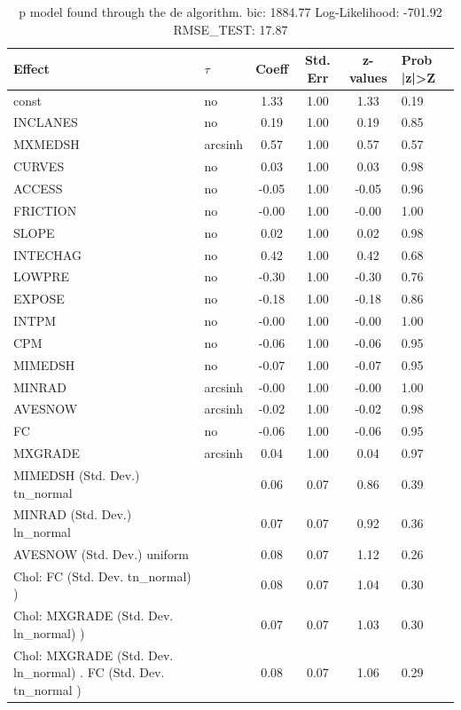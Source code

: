 \begin{table}
	\caption{p model found through the de algorithm. bic: 1884.77 Log-Likelihood: -701.92 RMSE_TEST: 17.87}
	\begin{center}
		\begin{tabular}{|l|l|c|c|c|l|}
			\hline
			Effect & $\tau$ & Coeff & Std. Err & z-values & Prob |z|>Z \\
			\hline
			const & no & 1.33 & 1.00 & 1.33 & 0.19 \\
			\hline
			INCLANES & no & 0.19 & 1.00 & 0.19 & 0.85 \\
			\hline
			MXMEDSH & arcsinh & 0.57 & 1.00 & 0.57 & 0.57 \\
			\hline
			CURVES & no & 0.03 & 1.00 & 0.03 & 0.98 \\
			\hline
			ACCESS & no & -0.05 & 1.00 & -0.05 & 0.96 \\
			\hline
			FRICTION & no & -0.00 & 1.00 & -0.00 & 1.00 \\
			\hline
			SLOPE & no & 0.02 & 1.00 & 0.02 & 0.98 \\
			\hline
			INTECHAG & no & 0.42 & 1.00 & 0.42 & 0.68 \\
			\hline
			LOWPRE & no & -0.30 & 1.00 & -0.30 & 0.76 \\
			\hline
			EXPOSE & no & -0.18 & 1.00 & -0.18 & 0.86 \\
			\hline
			INTPM & no & -0.00 & 1.00 & -0.00 & 1.00 \\
			\hline
			CPM & no & -0.06 & 1.00 & -0.06 & 0.95 \\
			\hline
			MIMEDSH & no & -0.07 & 1.00 & -0.07 & 0.95 \\
			\hline
			MINRAD & arcsinh & -0.00 & 1.00 & -0.00 & 1.00 \\
			\hline
			AVESNOW & arcsinh & -0.02 & 1.00 & -0.02 & 0.98 \\
			\hline
			FC & no & -0.06 & 1.00 & -0.06 & 0.95 \\
			\hline
			MXGRADE & arcsinh & 0.04 & 1.00 & 0.04 & 0.97 \\
			\hline
			MIMEDSH (Std. Dev.) tn_normal &  & 0.06 & 0.07 & 0.86 & 0.39 \\
			\hline
			MINRAD (Std. Dev.) ln_normal &  & 0.07 & 0.07 & 0.92 & 0.36 \\
			\hline
			AVESNOW (Std. Dev.) uniform &  & 0.08 & 0.07 & 1.12 & 0.26 \\
			\hline
			 Chol: FC (Std. Dev. tn_normal) ) &  & 0.08 & 0.07 & 1.04 & 0.30 \\
			\hline
			 Chol: MXGRADE (Std. Dev. ln_normal) ) &  & 0.07 & 0.07 & 1.03 & 0.30 \\
			\hline
			 Chol: MXGRADE (Std. Dev. ln_normal) . FC (Std. Dev.   tn_normal ) &  & 0.08 & 0.07 & 1.06 & 0.29 \\
			\hline
		\end{tabular}
	\end{center}
\end{table}
